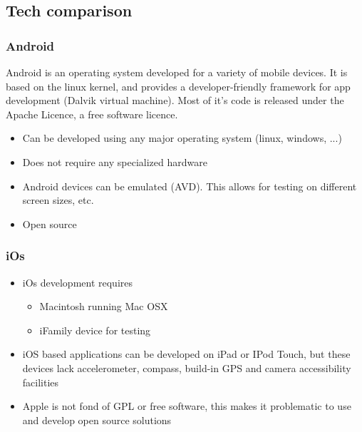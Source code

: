 \subsection{Tech comparison}

\subsubsection{Android}

	Android is an operating system developed for a variety of mobile devices.
	It is based on the linux kernel, and provides a developer-friendly framework
	for app development (Dalvik virtual machine). Most of it's code is released
	under the Apache Licence, a free software licence.

	\begin{itemize}
		\item Can be developed using any major operating system (linux, windows, ...)
		\item Does not require any specialized hardware
		\item Android devices can be emulated (AVD). This allows for testing on
		different screen sizes, etc.
		\item Open source
	\end{itemize}

\subsubsection{iOs}

	\begin{itemize}
		\item iOs development requires
			\begin{itemize}
				\item Macintosh running Mac OSX
				\item iFamily device for testing
			\end{itemize}
		\item iOS based applications can be developed on iPad or IPod Touch, but
		these devices lack accelerometer, compass, build-in GPS and camera
		accessibility facilities
		\item Apple is not fond of GPL or free software, this makes it
		problematic to use and develop open source solutions 
	\end{itemize}


